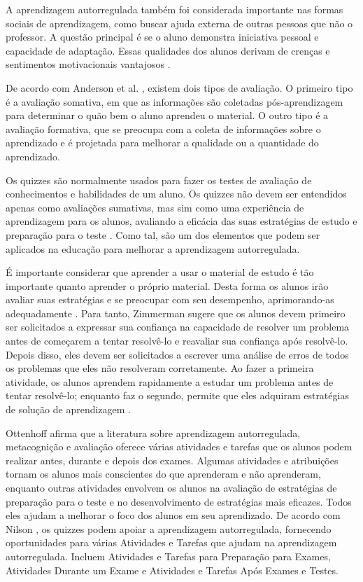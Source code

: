 A aprendizagem autorregulada também foi considerada importante nas formas sociais de aprendizagem, como buscar ajuda externa de outras pessoas que não o professor. A questão principal é se o aluno demonstra iniciativa pessoal e capacidade de adaptação. Essas qualidades dos alunos derivam de crenças e sentimentos motivacionais vantajosos \cite{zimmerman_chapter_2000}.

De acordo com Anderson et al. \cite{anderson_taxonomy_2000}, existem dois tipos de avaliação. O primeiro tipo é a avaliação somativa, em que as informações são coletadas pós-aprendizagem para determinar o quão bem o aluno aprendeu o material. O outro tipo é a avaliação formativa, que se preocupa com a coleta de informações sobre o aprendizado e é projetada para melhorar a qualidade ou a quantidade do aprendizado.

Os quizzes são normalmente usados para fazer os testes de avaliação de conhecimentos e habilidades de um aluno. Os quizzes não devem ser entendidos apenas como avaliações sumativas, mas sim como uma experiência de aprendizagem para os alunos, avaliando a eficácia das suas estratégias de estudo e preparação para o teste \cite{nilson_creating_2013}. Como tal, são um dos elementos que podem ser aplicados na educação para melhorar a aprendizagem autorregulada.

É importante considerar que aprender a usar o material de estudo é tão importante quanto aprender o próprio material. Desta forma os alunos irão avaliar suas estratégias e se preocupar com seu desempenho, aprimorando-as adequadamente \cite{fink_creating_2013}. Para tanto, Zimmerman sugere que os alunos devem primeiro ser solicitados a expressar sua confiança na capacidade de resolver um problema antes de começarem a tentar resolvê-lo e reavaliar sua confiança após resolvê-lo. Depois disso, eles devem ser solicitados a escrever uma análise de erros de todos os problemas que eles não resolveram corretamente. Ao fazer a primeira atividade, os alunos aprendem rapidamente a estudar um problema antes de tentar resolvê-lo; enquanto faz o segundo, permite que eles adquiram estratégias de solução de aprendizagem \cite{zimmerman_enhancing_2011}.

Ottenhoff \cite{ottenhoff_learning_2011} afirma que a literatura sobre aprendizagem autorregulada, metacognição e avaliação oferece várias atividades e tarefas que os alunos podem realizar antes, durante e depois dos exames. Algumas atividades e atribuições tornam os alunos mais conscientes do que aprenderam e não aprenderam, enquanto outras atividades envolvem os alunos na avaliação de estratégias de preparação para o teste e no desenvolvimento de estratégias mais eficazes. Todos eles ajudam a melhorar o foco dos alunos em seu aprendizado. De acordo com Nilson \cite{nilson_creating_2013}, os quizzes podem apoiar a aprendizagem autorregulada, fornecendo oportunidades para várias Atividades e Tarefas que ajudam na aprendizagem autorregulada. Incluem Atividades e Tarefas para Preparação para Exames, Atividades Durante um Exame e Atividades e Tarefas Após Exames e Testes.

